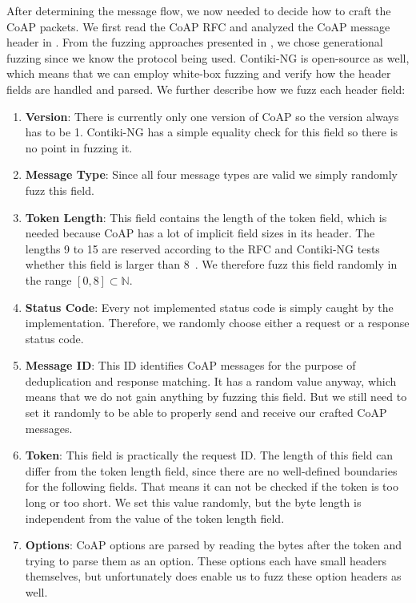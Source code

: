 After determining the message flow, we now needed to decide how to craft the CoAP packets. We first read the CoAP RFC and analyzed the CoAP message header in . From the fuzzing approaches presented in , we chose generational fuzzing since we know the protocol being used. Contiki-NG is open-source as well, which means that we can employ white-box fuzzing and verify how the header fields are handled and parsed. We further describe how we fuzz each header field:
\begin{enumerate}
	\item \textbf{Version}: There is currently only one version of CoAP so the version always has to be 1. Contiki-NG has a simple equality check for this field so there is no point in fuzzing it.
	\item \textbf{Message Type}: Since all four message types are valid we simply randomly fuzz this field.
	\item \textbf{Token Length}: This field contains the length of the token field, which is needed because CoAP has a lot of implicit field sizes in its header. The lengths 9 to 15 are reserved according to the RFC and Contiki-NG tests whether this field is larger than 8~\cite{RFC7252}. We therefore fuzz this field randomly in the range $[0, 8] \subset \mathbb{N}$.
	\item \textbf{Status Code}: Every not implemented status code is simply caught by the implementation. Therefore, we randomly choose either a request or a response status code.
	\item \textbf{Message ID}: This ID identifies CoAP messages for the purpose of deduplication and response matching. It has a random value anyway, which means that we do not gain anything by fuzzing this field. But we still need to set it randomly to be able to properly send and receive our crafted CoAP messages.
	\item \textbf{Token}: This field is practically the request ID. The length of this field can differ from the token length field, since there are no well-defined boundaries for the following fields. That means it can not be checked if the token is too long or too short. We set this value randomly, but the byte length is independent from the value of the token length field.
	\item \textbf{Options}: CoAP options are parsed by reading the bytes after the token and trying to parse them as an option. These options each have small headers themselves, but unfortunately \scapy does enable us to fuzz these option headers as well.


\end{enumerate}
